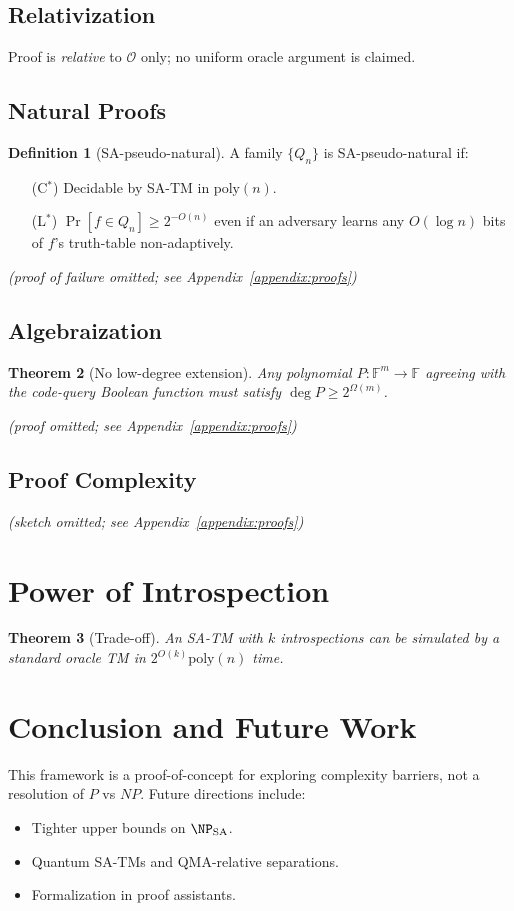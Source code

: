 \documentclass[12pt]{article}
\newcommand{\SA}{\mathrm{SA}}
\newcommand{\OO}{\mathcal{O}}
\newcommand{\poly}{\mathrm{poly}}
\newcommand{\F}{\mathbb{F}}
\theoremstyle{definition}
\newtheorem{definition}{Definition}[section]
\theoremstyle{plain}
\newtheorem{theorem}[definition]{Theorem}
\begin{document}
\subsection{Relativization}
Proof is \emph{relative} to \(\OO\) only; no uniform oracle argument is claimed.

\subsection{Natural Proofs}
\begin{definition}[SA-pseudo-natural]\label{def:pseudo}
A family \(\{Q_n\}\) is SA-pseudo-natural if:
\begin{itemize}
  \item[(C\(^*\))] Decidable by SA-TM in \(\poly(n)\).
  \item[(L\(^*\))] \(\Pr[f\in Q_n]\ge2^{-O(n)}\) even if an adversary learns any
      \(O(\log n)\) bits of \(f\)'s truth-table non-adaptively.
\end{itemize}
\end{definition}
\emph{(proof of failure omitted; see Appendix~\ref{appendix:proofs})}

\subsection{Algebraization}
\begin{theorem}[No low-degree extension]\label{thm:nolde}
Any polynomial \(P:\F^m\to\F\) agreeing with the code-query Boolean
function must satisfy \(\deg P\ge2^{\Omega(m)}\).
\end{theorem}
\emph{(proof omitted; see Appendix~\ref{appendix:proofs})}

\subsection{Proof Complexity}
\emph{(sketch omitted; see Appendix~\ref{appendix:proofs})}

\section{Power of Introspection}
\begin{theorem}[Trade-off]\label{thm:tradeoff}
An SA-TM with \(k\) introspections can be simulated by a standard
oracle TM in \(2^{O(k)}\poly(n)\) time.
\end{theorem}

\section{Conclusion and Future Work}
This framework is a proof-of-concept for exploring complexity barriers,
not a resolution of \(P\) vs \(NP\).  Future directions include:
\begin{itemize}
  \item Tighter upper bounds on \(\NP_{\SA}\).
  \item Quantum SA-TMs and QMA-relative separations.
  \item Formalization in proof assistants.
\end{itemize}
\end{document}

